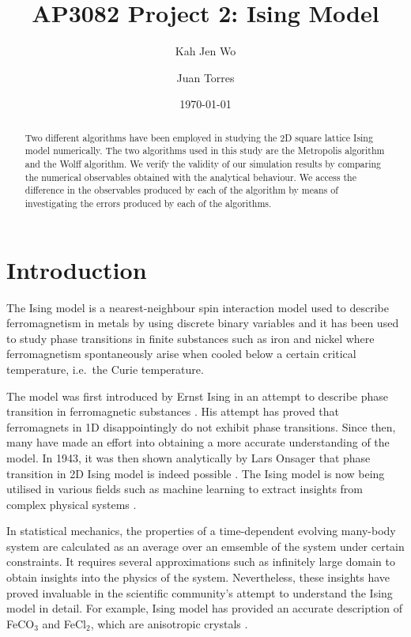 \documentclass[pra,aps,superscriptaddress,amssymb,amsmath,reprint,noeprint,floatfix]{revtex4-2}
\begin{document}
\title{AP3082 Project 2: Ising Model}
\date{\today}

\author{Kah Jen Wo}
\author{Juan Torres}

\begin{abstract}
    Two different algorithms have been employed in studying the 2D square lattice Ising model numerically. The two algorithms used in this study are the Metropolis algorithm and the Wolff algorithm. We verify the validity of our simulation results by comparing the numerical observables obtained with the analytical behaviour. We access the difference in the observables produced by each of the algorithm by means of investigating the errors produced by each of the algorithms.
\end{abstract}
\maketitle

\section{\label{sec:introduction}Introduction}
The Ising model is a nearest-neighbour spin interaction model used to describe ferromagnetism in metals by using discrete binary variables and it has been used to study phase transitions in finite substances such as iron and nickel where ferromagnetism spontaneously arise when cooled below a certain critical temperature, i.e.\ the Curie temperature.

The model was first introduced by Ernst Ising in an attempt to describe phase transition in ferromagnetic substances \cite{1925ZPhy...31..253I}. His attempt has proved that ferromagnets in 1D disappointingly do not exhibit phase transitions. Since then, many have made an effort into obtaining a more accurate understanding of the model. In 1943, it was then shown analytically by Lars Onsager that phase transition in 2D Ising model is indeed possible \cite{PhysRev.65.117}. The Ising model is now being utilised in various fields such as machine learning to extract insights from complex physical systems \cite{Walker2020}. 

In statistical mechanics, the properties of a time-dependent evolving many-body system are calculated as an average over an emsemble of the system under certain constraints. It requires several approximations such as infinitely large domain to obtain insights into the physics of the system. Nevertheless, these insights have proved invaluable in the scientific community's attempt to understand the Ising model in detail. For example, Ising model has provided an accurate description of FeCO$_3$ and FeCl$_2$, which are anisotropic crystals \cite{diu1989elements}.
\end{document}
